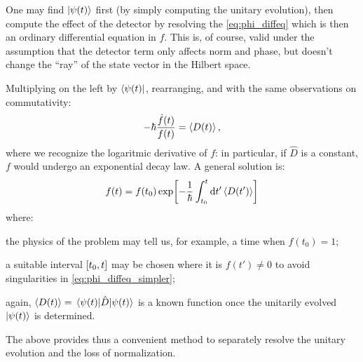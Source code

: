 One may find $\ket{\psi(t)}$ first (by simply computing the unitary evolution),
then compute the effect of the detector by resolving the \eqref{eq:phi_diffeq}
which is then an ordinary differential equation in $f$. This is, of course, valid
under the assumption that the detector term only affects norm and phase,
but doesn't change the ``ray'' of the state vector in the Hilbert space. 

Multiplying on the left by $\bra{\psi(t)}$, rearranging, and with the same observations
on commutativity:
\begin{equation}\label{eq:phi_diffeq_simpler}
  -\hbar\frac{\dot{f}(t)}{f(t)} = \ev{D(t)} \text{,}
\end{equation}
where we recognize the logaritmic derivative of $f$: in particular,
if $\hat{D}$ is a constant, $f$ would undergo an exponential decay law.
A general solution is:
\begin{equation}\label{eq:f-evol}
  f(t) = f(t_0) \exp[ -\frac{1}{\hbar} \int_{t_0}^{t} \dd{t'} \ev{D(t')} ]
\end{equation}
where:
\begin{enumerate*}[label=\emph{\alph*})]
  \item
    the physics of the problem may tell us, for example, a time when $f(t_0) = 1$;
  \item
    a suitable interval $\qty[t_0, t]$ may be chosen where it is $f(t') \ne 0$
    to avoid singularities in \eqref{eq:phi_diffeq_simpler};
  \item
    again, $\ev{D(t)} = \mel{\psi(t)}{\hat{D}}{\psi(t)}$ is a known function
    once the unitarily evolved $\ket{\psi(t)}$ is determined.
\end{enumerate*}

The above provides thus a convenient method to separately resolve
the unitary evolution and the loss of normalization.
   